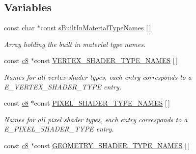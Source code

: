 \subsection*{Variables}
\begin{DoxyCompactItemize}
\item 
\mbox{\label{namespaceirr_1_1video_afcf17e217ef40e3d389ea061d7ea6215}} 
const char $\ast$const \hyperlink{namespaceirr_1_1video_afcf17e217ef40e3d389ea061d7ea6215}{s\+Built\+In\+Material\+Type\+Names} \mbox{[}$\,$\mbox{]}
\begin{DoxyCompactList}\small\item\em Array holding the built in material type names. \end{DoxyCompactList}\item 
\mbox{\label{namespaceirr_1_1video_ae350a7b3ae08d477b664cc713f1f85fd}} 
const \hyperlink{namespaceirr_a9395eaea339bcb546b319e9c96bf7410}{c8} $\ast$const \hyperlink{namespaceirr_1_1video_ae350a7b3ae08d477b664cc713f1f85fd}{V\+E\+R\+T\+E\+X\+\_\+\+S\+H\+A\+D\+E\+R\+\_\+\+T\+Y\+P\+E\+\_\+\+N\+A\+M\+ES} \mbox{[}$\,$\mbox{]}
\begin{DoxyCompactList}\small\item\em Names for all vertex shader types, each entry corresponds to a E\+\_\+\+V\+E\+R\+T\+E\+X\+\_\+\+S\+H\+A\+D\+E\+R\+\_\+\+T\+Y\+PE entry. \end{DoxyCompactList}\item 
\mbox{\label{namespaceirr_1_1video_a6e41c27ba13052dfd02341e9d24b5d38}} 
const \hyperlink{namespaceirr_a9395eaea339bcb546b319e9c96bf7410}{c8} $\ast$const \hyperlink{namespaceirr_1_1video_a6e41c27ba13052dfd02341e9d24b5d38}{P\+I\+X\+E\+L\+\_\+\+S\+H\+A\+D\+E\+R\+\_\+\+T\+Y\+P\+E\+\_\+\+N\+A\+M\+ES} \mbox{[}$\,$\mbox{]}
\begin{DoxyCompactList}\small\item\em Names for all pixel shader types, each entry corresponds to a E\+\_\+\+P\+I\+X\+E\+L\+\_\+\+S\+H\+A\+D\+E\+R\+\_\+\+T\+Y\+PE entry. \end{DoxyCompactList}\item 
\mbox{\label{namespaceirr_1_1video_a0434295dac50cfef95a4b8d471db6abb}} 
const \hyperlink{namespaceirr_a9395eaea339bcb546b319e9c96bf7410}{c8} $\ast$const \hyperlink{namespaceirr_1_1video_a0434295dac50cfef95a4b8d471db6abb}{G\+E\+O\+M\+E\+T\+R\+Y\+\_\+\+S\+H\+A\+D\+E\+R\+\_\+\+T\+Y\+P\+E\+\_\+\+N\+A\+M\+ES} \mbox{[}$\,$\mbox{]}

\end{DoxyCompactItemize}
